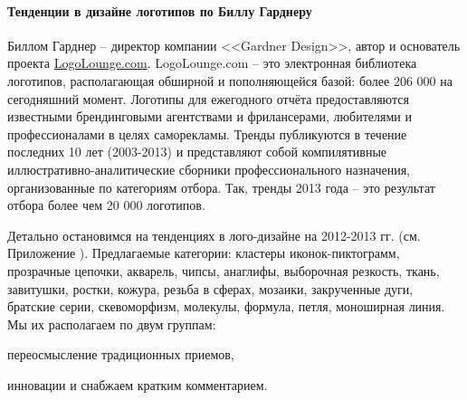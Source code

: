 \paragraph{Тенденции в дизайне логотипов по Биллу Гарднеру}

Биллом Гарднер -- директор компании <<Gardner Design>>, автор и основатель проекта
\url{LogoLounge.com}. LogoLounge.com -- это электронная библиотека логотипов, располагающая обширной и
пополняющейся базой: более 206 000 на сегодняшний момент. Логотипы для ежегодного отчёта
предоставляются известными брендинговыми агентствами и фрилансерами, любителями и профессионалами в
целях саморекламы. Тренды публикуются в течение последних 10 лет (2003-2013) и представляют собой
компилятивные иллюстративно-аналитические сборники профессионального назначения, организованные по
категориям отбора. Так, тренды 2013 года -- это результат отбора более чем 20 000 логотипов.
\autocite{link:logolounge2012}\autocite{link:logolounge2013}

Детально остановимся на тенденциях в лого-дизайне на 2012-2013 гг.
(см. Приложение \label{app:logotrends}). Предлагаемые категории: кластеры иконок-пиктограмм,
прозрачные цепочки, акварель, чипсы, анаглифы, выборочная резкость, ткань, завитушки, ростки,
кожура, резьба в сферах, мозаики, закрученные дуги, братские серии, скевоморфизм, молекулы, формула,
петля, моноширная линия.  Мы их располагаем по двум группам:
\begin{enumerate*}[label=\asbuk*)]
\item переосмысление традиционных приемов,
\item инновации  и снабжаем кратким комментарием.
\end{enumerate*}

